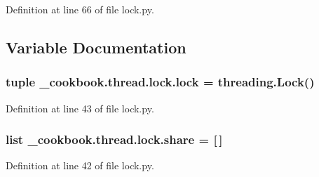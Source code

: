 Definition at line 66 of file lock.\-py.



\subsection{Variable Documentation}
\hypertarget{namespace__cookbook_1_1thread_1_1lock_a3289d10edb64e7979ae4e31600fa6be4}{
\subsubsection[{lock}]{\setlength{\rightskip}{0pt plus 5cm}tuple \-\_\-cookbook.\-thread.\-lock.\-lock = threading.\-Lock()}}\label{namespace__cookbook_1_1thread_1_1lock_a3289d10edb64e7979ae4e31600fa6be4}


Definition at line 43 of file lock.\-py.

\hypertarget{namespace__cookbook_1_1thread_1_1lock_a01cd21c9f5d662e95ebfc9c4b7f8629c}{
\subsubsection[{share}]{\setlength{\rightskip}{0pt plus 5cm}list \-\_\-cookbook.\-thread.\-lock.\-share = \mbox{[}$\,$\mbox{]}}}\label{namespace__cookbook_1_1thread_1_1lock_a01cd21c9f5d662e95ebfc9c4b7f8629c}


Definition at line 42 of file lock.\-py.

